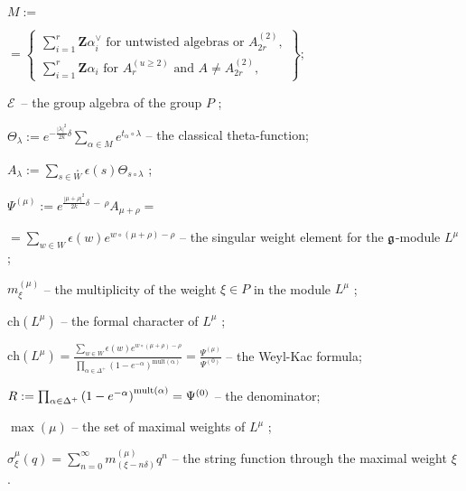 \documentclass{article}
\begin{document}
$M:=$

\noindent $=\left\{
\begin{array}{c}
\sum_{i=1}^{r}\mathbf{Z}\alpha _{i}^{\vee }\text{ for untwisted algebras or }%
A_{2r}^{\left( 2\right) }, \\
\sum_{i=1}^{r}\mathbf{Z}\alpha _{i}\text{ for }A_{r}^{\left( u\geq 2\right) }%
\text{ and }A\neq A_{2r}^{\left( 2\right) },
\end{array}
\right\} ;$

$\mathcal{E}$\ -- the group algebra of the group $P$ ;

$\Theta _{\lambda }:=e^{-\frac{\left| \lambda \right| ^{2}}{2k}\delta
}\sum\limits_{\alpha \in M}e^{t_{\alpha }\circ \lambda }$ -- the classical
theta-function;

$A_{\lambda }:=\sum\limits_{s\in \overset{\circ }{W}}\epsilon (s)\Theta
_{s\circ \lambda }$ ;

$\Psi ^{\left( \mu \right) }:=e^{\frac{\left| \mu +\rho \right| ^{2}}{2k}%
\delta \ -\ \rho }A_{\mu +\rho }=$

\noindent $=\sum\limits_{w\in W}\epsilon (w)e^{w\circ(\mu +\rho )-\rho }$ --
the singular weight element for the $\frak{g}$-module $L^{\mu }$;

$m_{\xi }^{\left( \mu \right) }$ -- the multiplicity of the weight $\xi \in
P $ in the module $L^{\mu }$ ;

$\mathrm{ch}\left( L^{\mu }\right) $ -- the formal character of $L^{\mu }$ ;

$\mathrm{ch}\left( L^{\mu }\right) =\frac{\sum_{w\in W}\epsilon (w)e^{w\circ
(\mu +\rho )-\rho }}{\prod_{\alpha \in \Delta ^{+}}\left( 1-e^{-\alpha
}\right) ^{\mathrm{{mult}\left( \alpha \right) }}}=\frac{\Psi ^{\left( \mu
\right) }}{\Psi ^{\left( 0\right) }}$ -- the Weyl-Kac formula;

$R:=\prod_{\alpha \in \Delta ^{+}}\left( 1-e^{-\alpha }\right) ^{\mathrm{{%
mult}\left( \alpha \right) }}=\Psi ^{\left( 0\right) }$ -- the denominator;

$\max (\mu )$ -- the set of maximal weights of $L^{\mu }$ ;

$\sigma _{\xi }^{\mu }\left( q\right) =\sum_{n=0}^{\infty }m_{\left( \xi
-n\delta \right) }^{\left( \mu \right) }q^{n}$ -- the string function
through the maximal weight $\xi $ .
\end{document}

